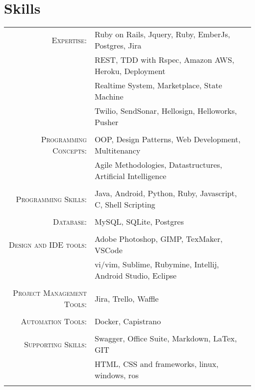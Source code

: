 \documentclass[a4paper,10pt]{article}
\begin{document}
\section{Skills}
\begin{tabular}{rl}	
\textsc{Expertise:} &Ruby on Rails, Jquery, Ruby, EmberJs, Postgres, Jira\\
								& REST, TDD with Rspec, Amazon AWS, Heroku, Deployment \\
								& Realtime System, Marketplace, State Machine\\
								& Twilio, SendSonar, Hellosign, Helloworks, Pusher  
								\\
								\\
\textsc{Programming Concepts:} &OOP, Design Patterns, Web Development, Multitenancy \\
								&  Agile Methodologies, Datastructures, Artificial Intelligence\\\\
\textsc{Programming Skills:}  & Java, Android, Python, Ruby, Javascript, C, Shell Scripting\\\\
\textsc{Database:} & MySQL, SQLite, Postgres\\\\

\textsc{Design and IDE tools:} & Adobe Photoshop, GIMP, TexMaker, VSCode\\
							   & vi/vim, Sublime, Rubymine, Intellij, Android Studio, Eclipse\\\\
\textsc{Project Management Tools:} & Jira, Trello, Waffle\\\\	
\textsc{Automation Tools:} &Docker, Capistrano\\\\
\textsc{Supporting Skills:} & Swagger, Office Suite, Markdown, LaTex, GIT\\
		& HTML, CSS and frameworks, linux, windows, ros \\\\						   
		 
\end{tabular}
\end{document}
